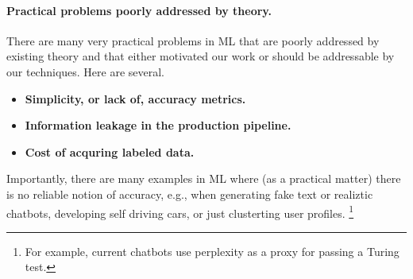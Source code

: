 \paragraph{Practical problems poorly addressed by theory.}
There are many very practical problems in ML that are poorly addressed by existing theory and that either motivated our work or should be addressable by our techniques.
Here are several.
\begin{itemize}[leftmargin=*]
\item
\textbf{Simplicity, or lack of,  accuracy metrics.}
\item
\textbf{Information leakage in the production pipeline.}
\item
\textbf{Cost of acquring labeled data.}
\end{itemize}
Importantly, there are many examples in ML where (as a practical matter) there is no reliable notion of accuracy, e.g., when generating fake text or realiztic chatbots, developing self driving cars, or just clusterting user profiles.
\footnote{For example, current chatbots use perplexity as a proxy for passing a Turing test.}
